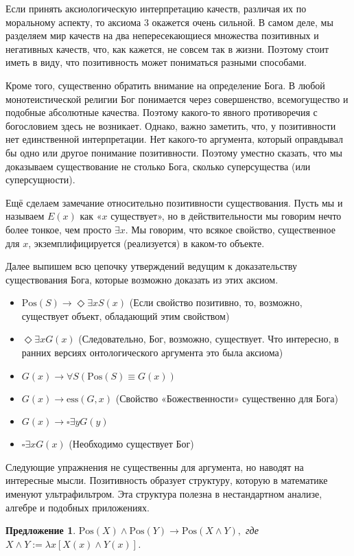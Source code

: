 \documentclass[openany]{book}
\theoremstyle{plain}
\newtheorem{prop}[thm]{Предложение}
\theoremstyle{definition}
\begin{document}
Если принять аксиологическую интерпретацию качеств, различая их по моральному аспекту, то аксиома 3 окажется очень сильной. В самом деле, мы разделяем мир качеств на два непересекающиеся множества позитивных и негативных качеств, что, как кажется, не совсем так в жизни. Поэтому стоит иметь в виду, что позитивность может пониматься разными способами.

Кроме того, существенно обратить внимание на определение Бога. В любой монотеистической религии Бог понимается через совершенство, всемогущество и подобные абсолютные качества. Поэтому какого-то явного противоречия с богословием здесь не возникает. Однако, важно заметить, что, у позитивности нет единственной интерпретации. Нет какого-то аргумента, который оправдывал бы одно или другое понимание позитивности. Поэтому уместно сказать, что мы доказываем существование не столько Бога, сколько суперсущества (или суперсущности).

Ещё сделаем замечание относительно позитивности существования. Пусть мы и называем \(E(x)\) как «\(x\) существует», но в действительности мы говорим нечто более тонкое, чем просто \(\exists x\). Мы говорим, что всякое свойство, существенное для \(x\), экземплифицируется (реализуется) в каком-то объекте.

Далее выпишем всю цепочку утверждений ведущим к доказательству существования Бога, которые возможно доказать из этих аксиом.

\begin{itemize}
    \item \(\mathrm{Pos}(S) \to \Diamond \exists x S(x)\) (Если свойство позитивно, то, возможно, существует объект, обладающий этим свойством)
    \item \(\Diamond \exists x G(x)\) (Следовательно, Бог, возможно, существует. Что интересно, в ранних версиях онтологического аргумента это была аксиома)
    \item \(G(x) \to \forall S (\mathrm{Pos}(S) \equiv G(x))\)
    \item \(G(x) \to \mathrm{ess}(G, x)\) (Свойство «Божественности» существенно для Бога)
    \item \(G(x) \to \square \exists y G(y)\) 
    \item \(\square \exists x G(x)\) (Необходимо существует Бог)
\end{itemize}

Следующие упражнения не существенны для аргумента, но наводят на интересные мысли. Позитивность образует структуру, которую в математике именуют ультрафильтром. Эта структура полезна в нестандартном анализе, алгебре и подобных приложениях.
\begin{prop}
    \(\mathrm{Pos}(X) \land \mathrm{Pos}(Y) \to \mathrm{Pos}(X \land Y),\) где \(X \land Y := \lambda x [X(x) \land Y(x)]\).
\end{prop}
\end{document}
